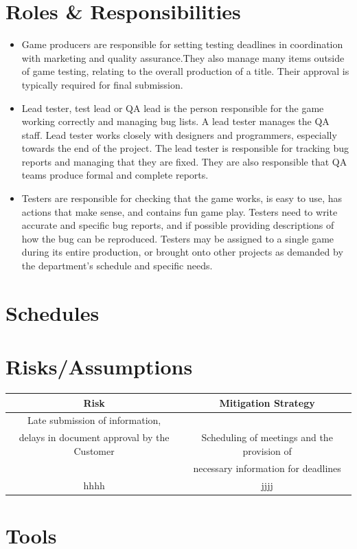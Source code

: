 \documentclass{article}
\begin{document}
\newpage

\section{Roles & Responsibilities}
\begin{itemize}
    \item Game producers are responsible for setting testing deadlines in coordination with marketing and quality assurance.They also manage many items outside of game testing, relating to the overall production of a title. Their approval is typically required for final submission.
    \item Lead tester, test lead or QA lead is the person responsible for the game working correctly and managing bug lists. A lead tester manages the QA staff. Lead tester works closely with designers and programmers, especially towards the end of the project. The lead tester is responsible for tracking bug reports and managing that they are fixed. They are also responsible that QA teams produce formal and complete reports.
    \item Testers are responsible for checking that the game works, is easy to use, has actions that make sense, and contains fun game play. Testers need to write accurate and specific bug reports, and if possible providing descriptions of how the bug can be reproduced. Testers may be assigned to a single game during its entire production, or brought onto other projects as demanded by the department's schedule and specific needs.
\end{itemize}
\newpage

\section{Schedules}

\newpage

\section{Risks/Assumptions}
\begin{table}[h!]
\centering
 \begin{tabular}{||c{1cm} c||} 
 \hline
 Risk & Mitigation Strategy \\ [0.5ex] 
 \hline
 \hline
 Late submission of information,\\ delays in document approval by the Customer & Scheduling of meetings and the provision of \\ & necessary information for deadlines\\ [1ex] 
 \hline
 hhhh & jjjj \\ [1ex] 
 \hline
 \end{tabular}
\end{table}
\newpage

\section{Tools}

\newpage
\end{document}

